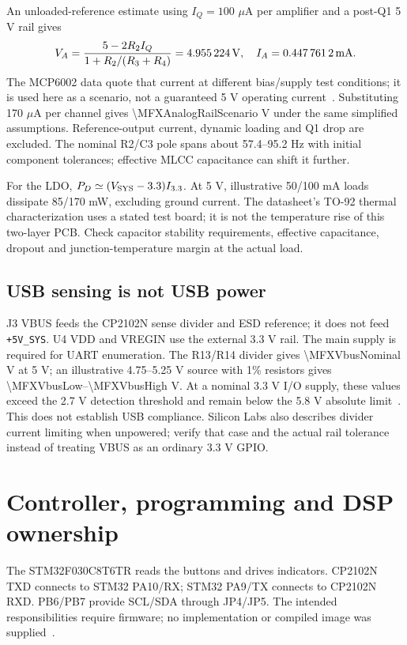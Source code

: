 \documentclass[a4paper,10pt]{article}
\newcommand{\nextsection}[1]{\clearpage\section{#1}}
\newcommand{\calc}[1]{\num[round-precision=3]{#1}}
\newcommand{\net}[1]{\texttt{#1}}
\begin{document}
An unloaded-reference estimate using $I_Q=100$ $\mu$A per amplifier and a post-Q1 5 V rail gives
\begin{equation}
V_A=\frac{5-2R_2I_Q}{1+R_2/(R_3+R_4)}=\SI{4.955224}{\volt},\quad
I_A=\SI{0.4477612}{\milli\ampere}.
\end{equation}
The MCP6002 data quote that current at different bias/supply test conditions; it is used here as a scenario, not a guaranteed 5 V operating current~\cite{mcp6002}. Substituting 170 $\mu$A per channel gives \calc{\MFXAnalogRailScenario} V under the same simplified assumptions. Reference-output current, dynamic loading and Q1 drop are excluded. The nominal R2/C3 pole spans about 57.4--95.2 Hz with initial component tolerances; effective MLCC capacitance can shift it further.

For the LDO, $P_D\simeq(V_{\rm SYS}-3.3)I_{3.3}$. At 5 V, illustrative 50/100 mA loads dissipate 85/170 mW, excluding ground current. The datasheet's TO-92 thermal characterization uses a stated test board; it is not the temperature rise of this two-layer PCB. Check capacitor stability requirements, effective capacitance, dropout and junction-temperature margin at the actual load.

\subsection{USB sensing is not USB power}
J3 VBUS feeds the CP2102N sense divider and ESD reference; it does not feed \net{+5V\_SYS}. U4 VDD and VREGIN use the external 3.3 V rail. The main supply is required for UART enumeration. The R13/R14 divider gives \calc{\MFXVbusNominal} V at 5 V; an illustrative 4.75--5.25 V source with 1\% resistors gives \calc{\MFXVbusLow}--\calc{\MFXVbusHigh} V. At a nominal 3.3 V I/O supply, these values exceed the 2.7 V detection threshold and remain below the 5.8 V absolute limit~\cite{cp2102n}. This does not establish USB compliance. Silicon Labs also describes divider current limiting when unpowered; verify that case and the actual rail tolerance instead of treating VBUS as an ordinary 3.3 V GPIO.

\nextsection{Controller, programming and DSP ownership}
\label{sec:control}
The STM32F030C8T6TR reads the buttons and drives indicators. CP2102N TXD connects to STM32 PA10/RX; STM32 PA9/TX connects to CP2102N RXD. PB6/PB7 provide SCL/SDA through JP4/JP5. The intended responsibilities require firmware; no implementation or compiled image was supplied~\cite{stm32}.
\end{document}
